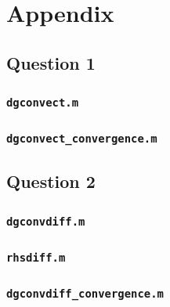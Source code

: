 \documentclass[10pt]{article}
\begin{document}
\section{Appendix}
\subsection{Question 1}
\subsubsection{{\tt dgconvect.m}}

\subsubsection{{\tt dgconvect\_convergence.m}}

\subsection{Question 2}
\subsubsection{{\tt dgconvdiff.m}}

\subsubsection{{\tt rhsdiff.m}}

\subsubsection{{\tt dgconvdiff\_convergence.m}}

\end{document}

